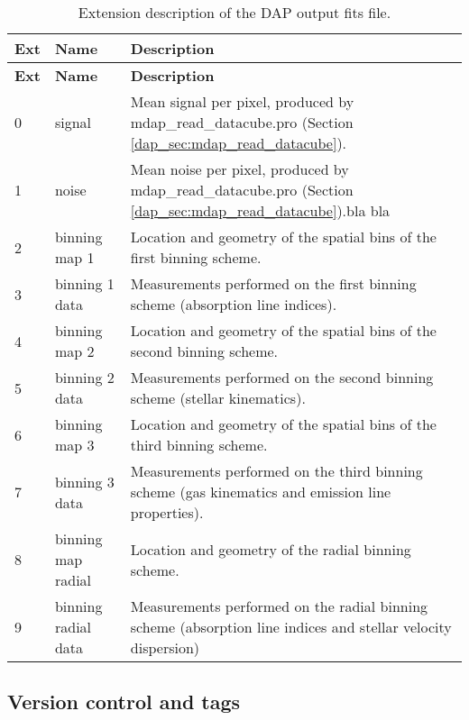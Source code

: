 \documentclass[11pt]{book}
\begin{document}
\begin{center}
\begin{longtable}{p{0.5cm}|p{3.5cm}| p{10.1cm}}
\caption{Extension description of the DAP output fits file.} \label{dap_tab:output} \\
\hline
{\bf Ext} &  {\bf Name} &{\bf Description} \\
\hline
\endfirsthead
\hline
{\bf Ext} &  {\bf Name} &{\bf Description} \\
\hline
\endhead
\hline
\endlastfoot
\hline
0 & signal              & Mean signal per pixel, produced by mdap\_read\_datacube.pro (Section \ref{dap_sec:mdap_read_datacube}). \\
1 & noise               & Mean noise per pixel, produced by mdap\_read\_datacube.pro (Section \ref{dap_sec:mdap_read_datacube}).bla bla \\
2 & binning map 1       & Location and geometry of the spatial bins of the first binning scheme.\\ 
3 & binning 1 data      & Measurements performed on the first binning scheme (absorption line indices).\\ 
4 & binning map 2       & Location and geometry of the spatial bins of the second binning scheme.\\ 
5 & binning 2 data      & Measurements performed on the second binning scheme (stellar kinematics). \\ 
6 & binning map 3       & Location and geometry of the spatial bins of the third binning scheme.\\ 
7 & binning 3 data      & Measurements performed on the third binning scheme (gas kinematics and emission line properties).\\ 
8 & binning map radial  & Location and geometry of the radial binning scheme.\\ 
9 & binning radial data & Measurements performed on the radial binning scheme (absorption line indices and stellar velocity dispersion)  \\ 
\hline
\end{longtable}
\end{center}



\subsection{Version control and tags}
\label{dap_sec:dap_version}
\end{document}
